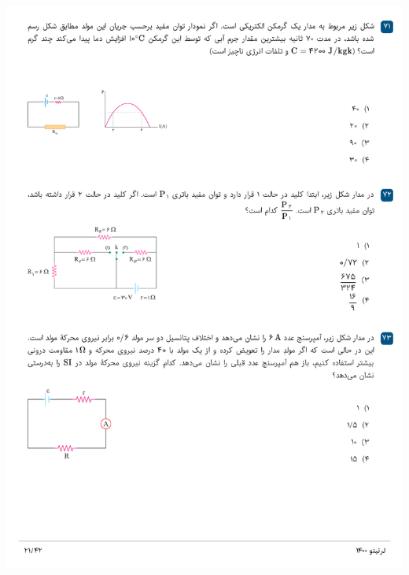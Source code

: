 \documentclass{book}
\begin{document}
\includegraphics[width=\textwidth]{"pages/21"}
\end{document}

